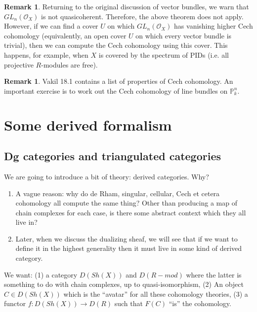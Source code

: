 \documentclass[10pt]{article}
\theoremstyle{definition}
\newtheorem{rmk}[thm]{Remark}
\newcommand{\OO}{\mathcal{O}}
\begin{document}
\begin{rmk}
Returning to the original discussion of vector bundles, we warn that $GL_n(\OO_X)$ is not quasicoherent. Therefore, the above theorem does not apply.  However, if we can find a cover $U$ on which $GL_n(\OO_X)$ has vanishing higher Cech cohomology (equivalently, an open cover $U$ on which every vector bundle is trivial), then we can compute the Cech cohomology using this cover.  This happens, for example, when $X$ is covered by the spectrum of PIDs (i.e. all projective $R$-modules are free).
\end{rmk}


\begin{rmk}
Vakil 18.1 contains a list of properties of Cech cohomology.  An important exercise is to work out the Cech cohomology of line bundles on $\mathbb{P}^n_k$.
\end{rmk}



\newpage

\section{Some derived formalism}

\subsection{Dg categories and triangulated categories}

We are going to introduce a bit of theory: derived categories.  Why?  
\begin{enumerate}
\item A vague reason: why do de Rham, singular, cellular, Cech et cetera cohomology all compute the same thing?  Other than producing a map of chain complexes for each case, is there some abstract context which they all live in? \item Later, when we discuss the dualizing sheaf, we will see that if we want to define it in the highest generality then it must live in some kind of derived category.
\end{enumerate}

We want: (1) a category $D(Sh(X))$ and $D(R-mod)$ where the latter is something to do with chain complexes, up to quasi-isomorphism, (2) An object $C \in D(Sh(X))$ which is the ``avatar'' for all these cohomology theories, (3) a functor $f: D(Sh(X)) \rightarrow D(R)$ such that $F(C)$ ``is'' the cohomology.
\end{document}
